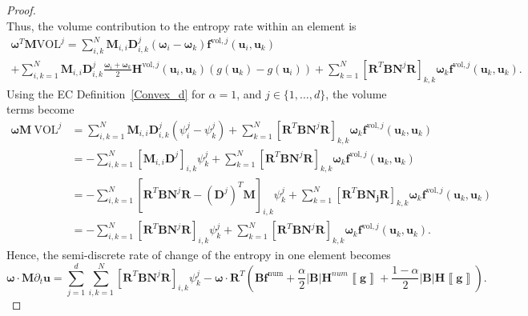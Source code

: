 \documentclass[]{scrartcl}
\newcommand{\mtx}[1]{\boldsymbol{#1}}
\renewcommand{\vec}[1]{\boldsymbol{#1}}
\newcommand{\jump}[1]{\left\llbracket #1  \right\rrbracket}
\theoremstyle{definition}
\begin{document}
\begin{proof}
\begin{equation}
\end{equation}
Thus, the volume contribution to the entropy rate within an element is
\begin{multline}
\vec{\omega}^T \mtx{M} \mtx{\mathrm{VOL}}^j
= \sum_{i,k}^N \mtx{M}_{i,i} \mtx{D}^j_{i,k} \left (\vec{\omega}_i - \vec{\omega}_k \right ) \vec{f}^{\mathrm{vol},j}\left (\vec{u}_i, \vec{u}_k \right )
\\
+  \sum_{i,k=1}^N \mtx{M}_{i,i} \mtx{D}^j_{i,k}  \frac{\vec{\omega}_i + \vec{\omega}_k}{2}  \vec{H}^{\mathrm{vol},j}(\vec{u}_i,\vec{u}_k)\left (g(\vec{u}_k) - g(\vec{u}_i) \right )
+ \sum_{k = 1}^N\left [ \mtx{R}^T\mtx{B} \mtx{N}^j \mtx{R} \right ]_{k,k} \vec{\omega}_k \vec{f}^{\mathrm{vol},j}\left(\vec{u}_k, \vec{u}_k \right).
    \label{step_cartesian}
\end{multline}
Using the EC Definition~\ref{Convex_d} for $\alpha = 1$, and $j \in \{1,\ldots,d\}$, the volume terms become
\begin{equation}
\begin{aligned}
\vec{\omega} \mtx{M}\  \mtx{\mathrm{VOL}}^j &= \sum_{i,k = 1}^N \mtx{M}_{i,i} \mtx{D}^j_{i,k} \left (\psi^j_i - \psi^j_k \right ) + \sum_{k = 1}^N\left [ \mtx{R}^T\mtx{B} \mtx{N}^j \mtx{R} \right ]_{k,k} \vec{\omega}_k \vec{f}^{\mathrm{vol},j}\left(\vec{u}_k, \vec{u}_k \right) \\
 &= - \sum_{i,k = 1}^N \left [ \mtx{M}_{i,i} \mtx{D}^j\right ]_{i,k} \psi^j_k + \sum_{k = 1}^N\left [ \mtx{R}^T\mtx{B} \mtx{N}^j \mtx{R} \right ]_{k,k} \vec{\omega}_k \vec{f}^{\mathrm{vol},j}\left(\vec{u}_k, \vec{u}_k \right) \\
&= - \sum_{i,k = 1}^N \left [ \mtx{R}^T \mtx{B} \mtx{N}^j \mtx{R} - (\mtx{D}^j)^T \mtx{M} \right ]_{i,k} \psi^j_k + \sum_{k = 1}^N\left [ \mtx{R}^T\mtx{B} \mtx{N_j} \mtx{R} \right ]_{k,k} \vec{\omega}_k \vec{f}^{\mathrm{vol},j}\left(\vec{u}_k, \vec{u}_k \right) \\
& = - \sum_{i,k = 1}^N \left [ \mtx{R}^T\mtx{B} \mtx{N}^j \mtx{R} \right ]_{i,k} \psi^j_k + \sum_{k = 1}^N\left [ \mtx{R}^T\mtx{B} \mtx{N}^j \mtx{R} \right ]_{k,k} \vec{\omega}_k \vec{f}^{\mathrm{vol},j}\left(\vec{u}_k, \vec{u}_k \right).
\end{aligned}
\end{equation}
Hence, the semi-discrete rate of change of the entropy in one element becomes
\begin{equation}
\vec{\omega} \cdot \mtx{M} \partial_t \vec{u} = \sum_{j=1}^{d}  \sum_{i,k = 1}^N \left [ \mtx{R}^T\mtx{B} \mtx{N}^j \mtx{R} \right ]_{i,k} \psi^j_k -\vec{\omega} \cdot \mtx{R}^T \left (\mtx{B} \vec{f}^{\mathrm{num}} +  \frac{\alpha}{2}|\mtx{B}| \mtx{H}^{num} \jump{\vec{g}} + \frac{1-\alpha}{2}|\mtx{B}| \mtx{H} \jump{\vec{g}} \right ).

\end{equation}
\end{proof}
\end{document}
